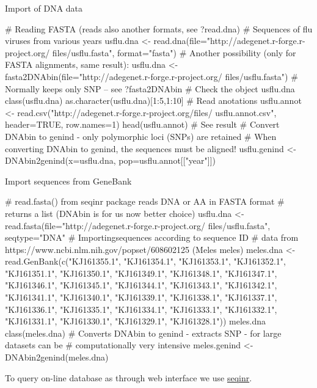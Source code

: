 \documentclass[compress, ucs, xelatex, 11pt, xcolor=svgnames,
  hyperref={
    bookmarks=true,
    unicode=true,
    colorlinks=true,
    pdftitle={Molecular data in R},
    plainpages=false,
    pdfauthor={Vojtech Zeisek},
    pdfsubject={Course about phylogeny and evolution in R},
    pdfcreator={XeLaTeX},
    pdfkeywords={R, evolution, phylogeny, molecular data},
    linkcolor=Tomato,
    anchorcolor=SaddleBrown,
    citecolor=Goldenrod,
    filecolor=DarkMagenta,
    menucolor=Sienna,
    urlcolor=DarkTurquoise,
    pdftex},
  url={hyphens, lowtilde} %
  ]{beamer}
\begin{document}
\begin{frame}[fragile]{Import of DNA data}
  \begin{spluscode}
    # Reading FASTA (reads also another formats, see ?read.dna)
    # Sequences of flu viruses from various years
    usflu.dna <- read.dna(file="http://adegenet.r-forge.r-project.org/
      files/usflu.fasta", format="fasta")
    # Another possibility (only for FASTA alignments, same result):
    usflu.dna <- fasta2DNAbin(file="http://adegenet.r-forge.r-project.org/
      files/usflu.fasta") # Normally keeps only SNP -- see ?fasta2DNAbin
    # Check the object
    usflu.dna
    class(usflu.dna)
    as.character(usflu.dna)[1:5,1:10]
    # Read anotations
    usflu.annot <- read.csv("http://adegenet.r-forge.r-project.org/files/
      usflu.annot.csv", header=TRUE, row.names=1)
    head(usflu.annot) # See result
    # Convert DNAbin to genind - only polymorphic loci (SNPs) are retained
    # When converting DNAbin to genind, the sequences must be aligned!
    usflu.genind <- DNAbin2genind(x=usflu.dna, pop=usflu.annot[["year"]])
  \end{spluscode}
\end{frame}

\begin{frame}[fragile]{Import sequences from GeneBank}
  \begin{spluscode}
    # read.fasta() from seqinr package reads DNA or AA in FASTA format
    # returns a list (DNAbin is for us now better choice)
    usflu.dna <- read.fasta(file="http://adegenet.r-forge.r-project.org/
      files/usflu.fasta", seqtype="DNA"
    # Importingsequences according to sequence ID
    # data from https://www.ncbi.nlm.nih.gov/popset/608602125 (Meles meles)
    meles.dna <- read.GenBank(c("KJ161355.1", "KJ161354.1", "KJ161353.1",
      "KJ161352.1", "KJ161351.1", "KJ161350.1", "KJ161349.1", "KJ161348.1",
      "KJ161347.1", "KJ161346.1", "KJ161345.1", "KJ161344.1", "KJ161343.1",
      "KJ161342.1", "KJ161341.1", "KJ161340.1", "KJ161339.1", "KJ161338.1",
      "KJ161337.1", "KJ161336.1", "KJ161335.1", "KJ161334.1", "KJ161333.1",
      "KJ161332.1", "KJ161331.1", "KJ161330.1", "KJ161329.1", "KJ161328.1"))
    meles.dna
    class(meles.dna)
    # Converts DNAbin to genind - extracts SNP - for large datasets can be
    # computationally very intensive
    meles.genind <- DNAbin2genind(meles.dna)
  \end{spluscode}
To query on-line database as through web interface we use \href{https://cran.r-project.org/web/packages/seqinr/index.html}{seqinr}.
\end{frame}
\end{document}
